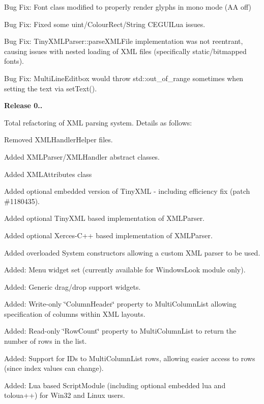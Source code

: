 \begin{DoxyItemize}
\item Bug Fix\+: Font class modified to properly render glyphs in mono mode (AA off)
\item Bug Fix\+: Fixed some uint/\+Colour\+Rect/\+String C\+E\+G\+U\+I\+Lua issues.
\item Bug Fix\+: Tiny\+X\+M\+L\+Parser\+::parse\+X\+M\+L\+File implementation was not reentrant, causing issues with nested loading of X\+ML files (specifically static/bitmapped fonts).
\item Bug Fix\+: Multi\+Line\+Editbox would throw std\+::out\+\_\+of\+\_\+range sometimes when setting the text via set\+Text().
\end{DoxyItemize}

{\bfseries{Release 0..}}
\begin{DoxyItemize}
\item Total refactoring of X\+ML parsing system. Details as follows\+:
\begin{DoxyItemize}
\item Removed X\+M\+L\+Handler\+Helper files.
\item Added X\+M\+L\+Parser/\+X\+M\+L\+Handler abstract classes.
\item Added X\+M\+L\+Attributes class
\item Added optional embedded version of Tiny\+X\+ML -\/ including efficiency fix (patch \#1180435).
\item Added optional Tiny\+X\+ML based implementation of X\+M\+L\+Parser.
\item Added optional Xerces-\/\+C++ based implementation of X\+M\+L\+Parser.
\item Added overloaded System constructors allowing a custom X\+ML parser to be used.
\end{DoxyItemize}
\item Added\+: Menu widget set (currently available for Windows\+Look module only).
\item Added\+: Generic drag/drop support widgets.
\item Added\+: Write-\/only \char`\"{}\+Column\+Header\char`\"{} property to Multi\+Column\+List allowing specification of columns within X\+ML layouts.
\item Added\+: Read-\/only \char`\"{}\+Row\+Count\char`\"{} property to Multi\+Column\+List to return the number of rows in the list.
\item Added\+: Support for I\+Ds to Multi\+Column\+List rows, allowing easier access to rows (since index values can change).
\item Added\+: Lua based Script\+Module (including optional embedded lua and toloua++) for Win32 and Linux users.

\end{DoxyItemize}

